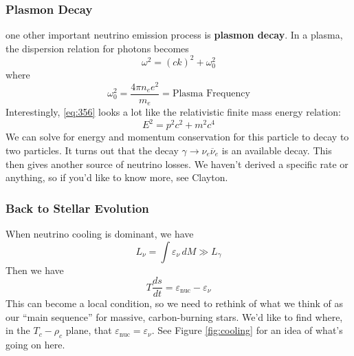 \documentclass[10pt]{article}
\numberwithin{equation}{section}
\newcommand{\figref}[1]{Figure \ref{#1}}
\begin{document}
    \subsubsection{Plasmon Decay}
    \label{sec:plasmon-decay}

    one other important neutrino emission process is \textbf{plasmon
      decay}. In a plasma, the dispersion relation for photons becomes
    \begin{equation}
      \label{eq:356}
      \omega^2=(ck)^2+\omega_0^2
    \end{equation}
    where 
    \begin{equation}
      \label{eq:357}
      \omega_0^2=\frac{4\pi n_e e^2}{m_e}=\textrm{Plasma Frequency}
    \end{equation}
    Interestingly, \eqref{eq:356} looks a lot like the relativistic
    finite mass energy relation:
    \begin{equation}
      \label{eq:358}
      E^2=p^2c^2+m^2 c^4
    \end{equation}
    We can solve for energy and momentum conservation for this particle
    to decay to two particles. It turns out that the decay $\gamma\to
    \nu_e\overline{\nu}_e$ is an available decay. This then gives
    another source of neutrino losses. We haven't derived a specific
    rate or anything, so if you'd like to know more, see Clayton.

    \subsubsection{Back to Stellar Evolution}
    \label{sec:back-stell-evol}

    When neutrino cooling is dominant, we have
    \begin{equation}
      \label{eq:359}
      L_\nu=\int \varepsilon_\nu\,dM\gg L_\gamma
    \end{equation}
    Then we have
    \begin{equation}
      \label{eq:360}
      T\frac{ds}{dt}=\varepsilon_{\mathrm{nuc}}-\varepsilon_\nu
    \end{equation}
    This can become a local condition, so we need to rethink of what
    we think of as our ``main sequence'' for massive, carbon-burning
    stars. We'd like to find where, in the $T_c-\rho_c$ plane, that
    $\varepsilon_{\mathrm{nuc}}=\varepsilon_\nu$. See
    \figref{fig:cooling} for an idea of what's going on here.\\
\end{document}
